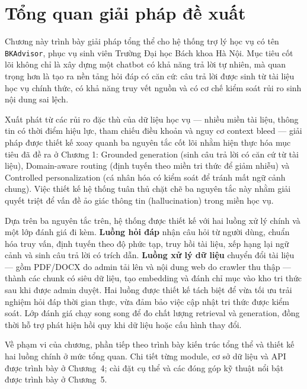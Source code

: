 \documentclass[../DoAn.tex]{subfiles}
\begin{document}
\section{Tổng quan giải pháp đề xuất}

Chương này trình bày giải pháp tổng thể cho hệ thống trợ lý học vụ có tên
\texttt{BKAdvisor}, phục vụ sinh viên Trường Đại học Bách khoa Hà Nội. Mục tiêu
cốt lõi không chỉ là xây dựng một chatbot có khả năng trả lời tự nhiên, mà
quan trọng hơn là tạo ra nền tảng hỏi đáp có căn cứ: câu trả lời được sinh từ
tài liệu học vụ chính thức, có khả năng truy vết nguồn và có cơ chế kiểm soát
rủi ro sinh nội dung sai lệch.

Xuất phát từ các rủi ro đặc thù của dữ liệu học vụ --- nhiều miền tài liệu, thông tin có thời điểm hiệu lực, tham chiếu điều khoản và nguy cơ context bleed --- giải pháp được thiết kế xoay quanh ba nguyên tắc cốt lõi nhằm hiện thực hóa mục tiêu đã đề ra ở Chương 1: Grounded generation (sinh câu trả lời có căn cứ từ tài liệu), Domain-aware routing (định tuyến theo miền tri thức để giảm nhiễu) và Controlled personalization (cá nhân hóa có kiểm soát để tránh mất ngữ cảnh chung). Việc thiết kế hệ thống tuân thủ chặt chẽ ba nguyên tắc này nhằm giải quyết triệt để vấn đề ảo giác thông tin (hallucination) trong miền học vụ.

Dựa trên ba nguyên tắc trên, hệ thống được thiết kế với hai luồng xử lý chính
và một lớp đánh giá đi kèm. \textbf{Luồng hỏi đáp} nhận câu hỏi từ người dùng,
chuẩn hóa truy vấn, định tuyến theo độ phức tạp, truy hồi tài liệu, xếp hạng
lại ngữ cảnh và sinh câu trả lời có trích dẫn. \textbf{Luồng xử lý dữ liệu}
chuyển đổi tài liệu --- gồm PDF/DOCX do admin tải lên và nội dung web do
crawler thu thập --- thành các chunk có siêu dữ liệu, tạo embedding và đánh
chỉ mục vào kho tri thức sau khi được admin duyệt. Hai
luồng được thiết kế tách biệt để vừa tối ưu trải nghiệm hỏi đáp thời gian
thực, vừa đảm bảo việc cập nhật tri thức được kiểm soát. Lớp đánh giá chạy
song song để đo chất lượng retrieval và generation, đồng thời hỗ trợ phát hiện
hồi quy khi dữ liệu hoặc cấu hình thay đổi.

Về phạm vi của chương, phần tiếp theo trình bày kiến trúc tổng thể và thiết kế
hai luồng chính ở mức tổng quan. Chi tiết từng module, cơ sở dữ liệu và API
được trình bày ở Chương~4; cài đặt cụ thể và các đóng góp kỹ thuật nổi bật
được trình bày ở Chương~5.
\end{document}
